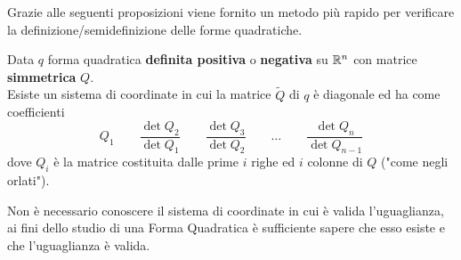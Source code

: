 \begin{appendices}
\vspace*{\baselineskip}
Grazie alle seguenti proposizioni viene fornito un metodo più rapido per verificare la definizione/semidefinizione delle forme quadratiche.
\begin{proposition}
	\label{prop:gram_schm}
	Data $q$ forma quadratica \textbf{definita positiva} o \textbf{negativa} su $\mathbb{R}^n$ con matrice \textbf{simmetrica} $Q$.\\
	Esiste un sistema di coordinate in cui la matrice $\tilde{Q}$ di $q$ è diagonale ed ha come coefficienti
	\[Q_1 \qquad \frac{\det Q_2}{\det Q_1} \qquad \frac{\det Q_3}{\det Q_2} \qquad \dotsc \qquad \frac{\det Q_n}{\det Q_{n-1}}\]
	dove $Q_i$ è la matrice costituita dalle prime $i$ righe ed $i$ colonne di $Q$ ("come negli orlati").
	\begin{note}
		Non è necessario conoscere il sistema di coordinate in cui è valida l'uguaglianza, ai fini dello studio di una Forma Quadratica è sufficiente sapere che esso esiste e che l'uguaglianza è valida.
	\end{note}
	\begin{center}
\end{center}
\end{proposition}
\end{appendices}
